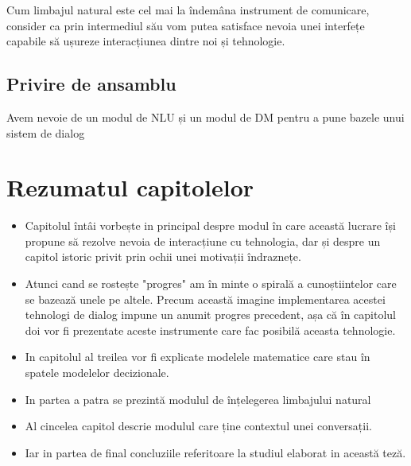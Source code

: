 Cum limbajul natural este cel mai la îndemâna instrument de comunicare, consider ca prin intermediul său vom putea satisface nevoia unei interfețe capabile să ușureze interacțiunea dintre noi și tehnologie.

\subsection{Privire de ansamblu}

Avem nevoie de un modul de NLU și un modul de DM pentru a pune bazele unui sistem de dialog

\section{Rezumatul capitolelor}

\begin{itemize}
	\item 
	Capitolul întâi vorbește in principal despre modul în care această lucrare își propune să rezolve nevoia de interacțiune cu tehnologia, dar și despre un capitol istoric privit prin ochii unei motivații îndraznețe.
	\item
	Atunci cand se rostește "progres" am în minte o  spirală a cunoștiintelor care se bazează unele pe altele. Precum această imagine implementarea acestei tehnologi de dialog impune un anumit progres precedent, așa că în capitolul doi vor fi prezentate aceste instrumente care fac posibilă aceasta tehnologie.
	\item
	In capitolul al treilea vor fi explicate modelele matematice care stau în spatele modelelor decizionale.
	\item
	In partea a patra se prezintă modulul de înțelegerea limbajului natural
	\item
	Al cincelea capitol descrie modulul care ține contextul unei conversații.
	\item
	Iar in partea de final concluziile referitoare la studiul elaborat in această teză.
\end{itemize}

